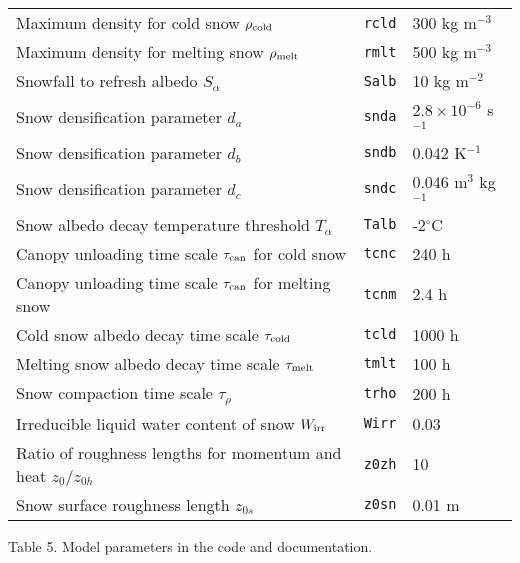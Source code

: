 \documentclass{article}
\begin{document}
\begin{tabular}{|l|l|l|}
Maximum density for cold snow $\rho_{\rm cold}$ & {\tt rcld} & 300 kg m$^{-3}$ \\
Maximum density for melting snow $\rho_{\rm melt}$ & {\tt rmlt} & 500 kg m$^{-3}$ \\
Snowfall to refresh albedo $S_\alpha$ & {\tt Salb} & 10 kg m$^{-2}$ \\
Snow densification parameter $d_a$ & {\tt snda} & $2.8 \times 10^{-6}$ s$^{-1}$ \\
Snow densification parameter $d_b$ & {\tt sndb} & 0.042 K$^{-1}$ \\
Snow densification parameter $d_c$ & {\tt sndc} & 0.046 m$^3$ kg$^{-1}$ \\
Snow albedo decay temperature threshold $T_\alpha$ & {\tt Talb} & -2$^\circ$C \\
Canopy unloading time scale $\tau_{\rm can}$ for cold snow & {\tt tcnc} & 240 h \\
Canopy unloading time scale $\tau_{\rm can}$ for melting snow & {\tt tcnm} & 2.4 h \\
Cold snow albedo decay time scale $\tau_{\rm cold}$ & {\tt tcld} & 1000 h \\
Melting snow albedo decay time scale $\tau_{\rm melt}$ & {\tt tmlt} & 100 h \\
Snow compaction time scale $\tau_\rho$ & {\tt trho} & 200 h \\
Irreducible liquid water content of snow $W_{\rm irr}$ & {\tt Wirr} & 0.03 \\
Ratio of roughness lengths for momentum and heat $z_0/z_{0h}$ & {\tt z0zh} & 10 \\
Snow surface roughness length $z_{0s}$ & {\tt z0sn} & 0.01 m \\
\hline
\end{tabular}

Table 5. Model parameters in the code and documentation.
\end{document}
